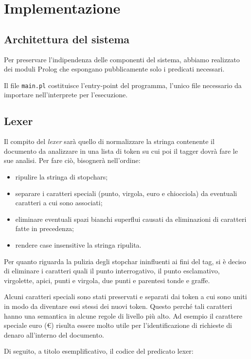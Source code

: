 \section{Implementazione}

\subsection{Architettura del sistema}
Per preservare l'indipendenza delle componenti del sistema, abbiamo realizzato dei moduli Prolog che espongano pubblicamente solo i predicati necessari.

Il file \verb+main.pl+ costituisce l'entry-point del programma, l'unico file necessario da importare nell'interprete per l'esecuzione.


\subsection{Lexer}
Il compito del \emph{lexer} sarà quello di normalizzare la stringa contenente il documento da analizzare in una lista di token su cui poi il tagger dovrà fare le sue analisi. Per fare ciò, bisognerà nell'ordine:
\begin{itemize}
    \item ripulire la stringa di stopchars;
    \item separare i caratteri speciali (punto, virgola, euro e chiocciola) da eventuali caratteri a cui sono associati;
    \item eliminare eventuali spazi bianchi superflui causati da eliminazioni di caratteri fatte in precedenza;
    \item rendere case insensitive la stringa ripulita.
\end{itemize}

Per quanto riguarda la pulizia degli stopchar ininfluenti ai fini del tag, si è deciso di eliminare i caratteri quali il punto interrogativo, il punto esclamativo, virgolette, apici, punti e virgola, due punti e parentesi tonde e graffe.

Alcuni caratteri speciali sono stati preservati e separati dai token a cui sono uniti in modo da diventare essi stessi dei nuovi token. Questo perché tali caratteri hanno una semantica in alcune regole di livello più alto.
Ad esempio il carattere speciale euro (€) risulta essere molto utile per l'identificazione di richieste di denaro all'interno del documento.

Di seguito, a titolo esemplificativo, il codice del predicato lexer:

